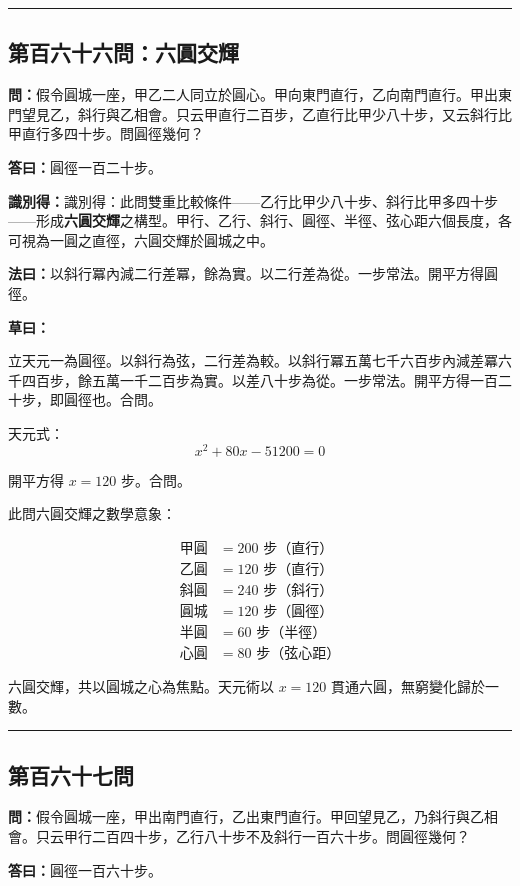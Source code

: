 \documentclass[11pt,a4paper]{article}
\newcommand{\longline}{\noindent\rule{\textwidth}{0.4pt}}
\newcommand{\wen}[1]{\par\noindent\textbf{\textcolor{probcolor}{問：}}{#1}\par}
\newcommand{\da}[1]{\par\noindent\textbf{\textcolor{anscolor}{答曰：}}{#1}\par}
\newcommand{\fayue}[1]{\par\noindent\textbf{\textcolor{methodcolor}{法曰：}}{#1}\par}
\newcommand{\caoyue}[1]{\par\noindent\textbf{草曰：}{#1}\par}
\newcommand{\zhi}[1]{\par\noindent\textbf{識別得：}{#1}\par}
\begin{document}
\vspace{0.5cm}
\longline

\subsection*{第百六十六問：六圓交輝}
\wen{假令圓城一座，甲乙二人同立於圓心。甲向東門直行，乙向南門直行。甲出東門望見乙，斜行與乙相會。只云甲直行二百步，乙直行比甲少八十步，又云斜行比甲直行多四十步。問圓徑幾何？}

\da{圓徑一百二十步。}

\zhi{識別得：此問雙重比較條件——乙行比甲少八十步、斜行比甲多四十步——形成\textbf{六圓交輝}之構型。甲行、乙行、斜行、圓徑、半徑、弦心距六個長度，各可視為一圓之直徑，六圓交輝於圓城之中。}

\fayue{以斜行冪內減二行差冪，餘為實。以二行差為從。一步常法。開平方得圓徑。}

\caoyue{
立天元一為圓徑。以斜行為弦，二行差為較。以斜行冪五萬七千六百步內減差冪六千四百步，餘五萬一千二百步為實。以差八十步為從。一步常法。開平方得一百二十步，即圓徑也。合問。

天元式：
$$x^2 + 80x - 51200 = 0$$

開平方得 $x = 120$ 步。合問。

此問六圓交輝之數學意象：

\begin{align*}
\text{甲圓} &= 200 \text{ 步（直行）} \\
\text{乙圓} &= 120 \text{ 步（直行）} \\
\text{斜圓} &= 240 \text{ 步（斜行）} \\
\text{圓城} &= 120 \text{ 步（圓徑）} \\
\text{半圓} &= 60 \text{ 步（半徑）} \\
\text{心圓} &= 80 \text{ 步（弦心距）}
\end{align*}

六圓交輝，共以圓城之心為焦點。天元術以 $x = 120$ 貫通六圓，無窮變化歸於一數。
}

\vspace{0.5cm}
\longline

\subsection*{第百六十七問}
\wen{假令圓城一座，甲出南門直行，乙出東門直行。甲回望見乙，乃斜行與乙相會。只云甲行二百四十步，乙行八十步不及斜行一百六十步。問圓徑幾何？}

\da{圓徑一百六十步。}
\end{document}
